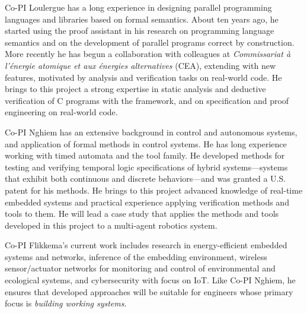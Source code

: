 Co-PI Loulergue has a long experience in designing parallel programming languages and libraries based on formal semantics. About ten years ago, he started using the \Coq proof assistant in his research on programming language semantics and on the development of parallel programs correct by construction. More recently he has begun a collaboration with colleagues at {\it Commissariat \`a l'\'energie atomique et aux \'energies alternatives} (CEA), extending \framac with new features, motivated by analysis and verification tasks on real-world code. He brings to this project a strong expertise in static analysis and deductive verification of C programs with the \framac framework, and on specification and proof engineering on real-world code. 

Co-PI Nghiem has an extensive background in control and autonomous systems, and application of formal methods in control systems.
He has long experience working with timed automata and the \uppaal tool family.
He developed methods for testing and verifying temporal logic specifications of hybrid systems---systems that exhibit both continuous and discrete behaviors---and was granted a U.S. patent for his methods.
He brings to this project advanced knowledge of real-time embedded systems and practical experience applying verification methods and tools to them.
He will lead a case study that applies the methods and tools developed in this project to a multi-agent robotics system.

Co-PI Flikkema's current work includes research in energy-efficient embedded systems and networks, inference of the embedding environment, wireless sensor/actuator networks for monitoring and control of environmental and ecological systems, and cybersecurity with focus on IoT.  Like Co-PI Nghiem, he ensures that developed approaches will be suitable for engineers whose primary focus is \emph{building working systems}.